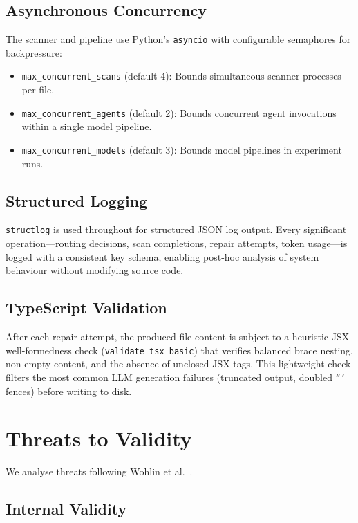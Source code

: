 \documentclass[10pt,conference]{IEEEtran}
\begin{document}
\subsection{Asynchronous Concurrency}

The scanner and pipeline use Python's \texttt{asyncio} with configurable
semaphores for backpressure:
\begin{itemize}
  \item \texttt{max\_concurrent\_scans} (default 4): Bounds simultaneous
    scanner processes per file.
  \item \texttt{max\_concurrent\_agents} (default 2): Bounds concurrent agent
    invocations within a single model pipeline.
  \item \texttt{max\_concurrent\_models} (default 3): Bounds model pipelines
    in experiment runs.
\end{itemize}

\subsection{Structured Logging}

\texttt{structlog} is used throughout for structured JSON log output.  Every
significant operation—routing decisions, scan completions, repair attempts,
token usage—is logged with a consistent key schema, enabling post-hoc
analysis of system behaviour without modifying source code.

\subsection{TypeScript Validation}

After each repair attempt, the produced file content is subject to a
heuristic JSX well-formedness check (\texttt{validate\_tsx\_basic}) that
verifies balanced brace nesting, non-empty content, and the absence of
unclosed JSX tags.  This lightweight check filters the most common LLM
generation failures (truncated output, doubled \texttt{```} fences) before
writing to disk.

\section{Threats to Validity}
\label{sec:threats}

We analyse threats following Wohlin et al.\ \cite{wohlin2012}.

\subsection{Internal Validity}
\end{document}
